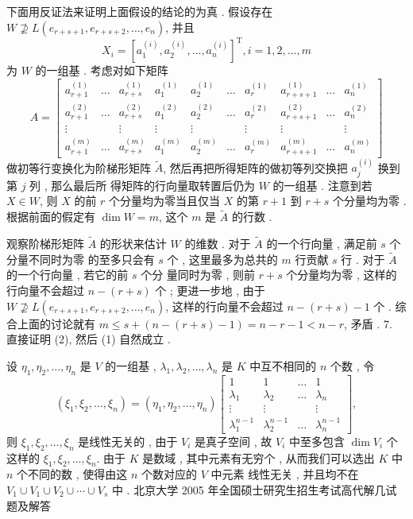 \documentclass[10pt]{article}
\begin{document}
 下面用反证法来证明上面假设的结论的为真 .  假设存在  $W \nsupseteq L\left(e_{r+s+1}, e_{r+s+2}, \ldots, e_{n}\right)$,  并且 
$$
X_{i}=\left[a_{1}^{(i)}, a_{2}^{(i)}, \ldots, a_{n}^{(i)}\right]^{\mathrm{T}}, i=1,2, \ldots, m
$$
 为  $W$  的一组基 .  考虑对如下矩阵 
$$
A=\left[\begin{array}{cccccccccc}
a_{r+1}^{(1)} & \ldots & a_{r+s}^{(1)} & a_{1}^{(1)} & a_{2}^{(1)} & \ldots & a_{r}^{(1)} & a_{r+s+1}^{(1)} & \ldots & a_{n}^{(1)} \\
a_{r+1}^{(2)} & \ldots & a_{r+s}^{(2)} & a_{1}^{(2)} & a_{2}^{(2)} & \ldots & a_{r}^{(2)} & a_{r+s+1}^{(2)} & \ldots & a_{n}^{(2)} \\
\vdots & & \vdots & \vdots & \vdots & & \vdots & \vdots & & \vdots \\
a_{r+1}^{(m)} & \ldots & a_{r+s}^{(m)} & a_{1}^{(m)} & a_{2}^{(m)} & \ldots & a_{r}^{(m)} & a_{r+s+1}^{(m)} & \ldots & a_{n}^{(m)}
\end{array}\right]
$$
 做初等行变换化为阶梯形矩阵  $\tilde{A}$,  然后再把所得矩阵的做初等列交换把  $a_{j}^{(i)}$  换到第  $j$  列 ,  那么最后所   得矩阵的行向量取转置后仍为  $W$  的一组基 .  注意到若  $X \in W$, 则  $X$  的前  $r$  个分量均为零当且仅当  $X$  的第  $r+1$  到  $r+s$  个分量均为零 .  根据前面的假定有  $\operatorname{dim} W=m$,  这个  $m$  是  $\tilde{A}$  的行数 .

 观察阶梯形矩阵  $\tilde{A}$  的形状来估计  $W$  的维数 .  对于  $\tilde{A}$  的一个行向量 ,  满足前  $s$  个分量不同时为零   的至多只会有  $s$  个 ,  这里最多为总共的  $m$  行贡献  $s$  行 .  对于  $\tilde{A}$  的一个行向量 ,  若它的前  $s$  个分   量同时为零 ,  则前  $r+s$  个分量均为零 ,  这样的行向量不会超过  $n-(r+s)$  个 ;  更进一步地 ,  由于  $W \nsupseteq L\left(e_{r+s+1}, e_{r+s+2}, \ldots, e_{n}\right)$,  这样的行向量不会超过  $n-(r+s)-1$  个 .  综合上面的讨论就有  $m \leqslant s+(n-(r+s)-1)=n-r-1<n-r$,  矛盾 . 7.  直接证明  (2),  然后  (1)  自然成立 .

 设  $\eta_{1}, \eta_{2}, \ldots, \eta_{n}$  是  $V$  的一组基 , $\lambda_{1}, \lambda_{2}, \ldots, \lambda_{n}$  是  $K$  中互不相同的  $n$  个数 ,  令 
$$
\left(\xi_{1}, \xi_{2}, \ldots, \xi_{n}\right)=\left(\eta_{1}, \eta_{2}, \ldots, \eta_{n}\right)\left[\begin{array}{cccc}
1 & 1 & \ldots & 1 \\
\lambda_{1} & \lambda_{2} & \ldots & \lambda_{n} \\
\vdots & \vdots & & \vdots \\
\lambda_{1}^{n-1} & \lambda_{2}^{n-1} & \ldots & \lambda_{n}^{n-1}
\end{array}\right],
$$
 则  $\xi_{1}, \xi_{2}, \ldots, \xi_{n}$  是线性无关的 ,  由于  $V_{i}$  是真子空间 ,  故  $V_{i}$  中至多包含  $\operatorname{dim} V_{i}$  个这样的  $\xi_{1}, \xi_{2}, \ldots, \xi_{n}$.  由于  $K$  是数域 ,  其中元素有无穷个 ,  从而我们可以选出  $K$  中  $n$  个不同的数 ,  使得由这  $n$  个数对应的  $V$  中元素   线性无关 ,  并且均不在  $V_{1} \cup V_{1} \cup V_{2} \cup \cdots \cup V_{s}$  中 .  北京大学  2005  年全国硕士研究生招生考试高代解几试题及解答 
\end{document}
